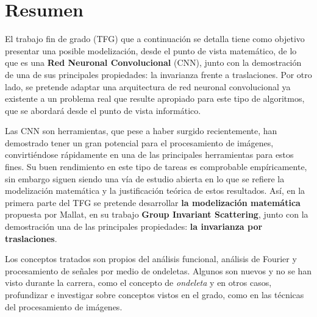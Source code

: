 %


\chapter{Resumen}

\noindent El trabajo fin de grado (TFG) que a continuación se detalla tiene como objetivo presentar una posible modelización, desde el punto de vista matemático, de lo que es una \textbf{Red Neuronal Convolucional} (CNN), junto con la demostración de una de sus principales propiedades: la invarianza frente a traslaciones. Por otro lado, se pretende adaptar una arquitectura de red neuronal convolucional ya existente a un problema real que resulte apropiado para este tipo de algoritmos, que se abordará desde el punto de vista informático.

\medskip

\noindent Las CNN son herramientas, que pese a haber surgido recientemente, han demostrado tener un gran potencial para el procesamiento de imágenes, convirtiéndose rápidamente en una de las principales herramientas para estos fines. Su buen rendimiento en este tipo de tareas es comprobable empíricamente, sin embargo siguen siendo una vía de estudio abierta en lo que se refiere la modelización matemática y la justificación teórica de estos resultados. Así, en la primera parte del TFG se pretende desarrollar \textbf{la modelización matemática} propuesta por Mallat, en su trabajo \textbf{Group Invariant Scattering}, junto con la demostración una de las principales propiedades: \textbf{la invarianza por traslaciones}.

\medskip
\noindent Los conceptos tratados son propios del análisis funcional, análisis de Fourier y procesamiento de señales por medio de ondeletas. Algunos son nuevos y no se han visto durante la carrera, como el concepto de \textit{ondeleta} y en otros casos, profundizar e investigar sobre conceptos vistos en el grado, como en las técnicas del procesamiento de imágenes.


\medskip

